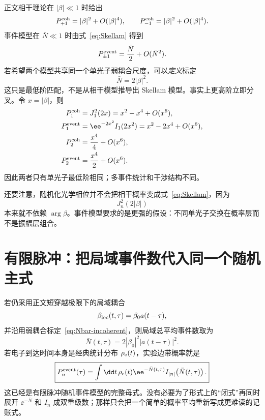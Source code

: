 正文相干理论在 \(|\beta|\ll1\) 时给出
\begin{equation}
P_{+1}^{\rm coh}=|\beta|^2+O(|\beta|^4),
\qquad
P_{-1}^{\rm coh}=|\beta|^2+O(|\beta|^4).
\end{equation}
事件模型在 \(\bar N\ll1\) 时由式~\eqref{eq:Skellam} 得到
\begin{equation}
P_{\pm1}^{\rm event}
=\frac{\bar N}{2}+O(\bar N^2).
\end{equation}
若希望两个模型共享同一个单光子弱耦合尺度，可以\emph{定义}标定
\begin{equation}
\boxed{\bar N=2|\beta|^2.}
\label{eq:Nbar-incoherent}
\end{equation}
这只是最低阶匹配，不是从相干模型推导出 Skellam 模型。事实上更高阶立即分叉。令 \(x=|\beta|\)，则
\begin{align}
P_1^{\rm coh}
&=J_1^2(2x)=x^2-x^4+O(x^6),\\
P_1^{\rm event}
&=\ee^{-2x^2}I_1(2x^2)=x^2-2x^4+O(x^6),\\
P_2^{\rm coh}
&=\frac{x^4}{4}+O(x^6),\\
P_2^{\rm event}
&=\frac{x^4}{2}+O(x^6).
\end{align}
因此两者只有单光子最低阶相同；多事件统计和干涉结构不同。

还要注意，随机化光学相位并不会把相干概率变成式~\eqref{eq:Skellam}，因为
\begin{equation}
J_n^2(2|\beta|)
\end{equation}
本来就不依赖 \(\arg\beta\)。事件模型要求的是更强的假设：不同单光子交换在概率层而不是振幅层组合。

\section{有限脉冲：把局域事件数代入同一个随机主式}

若仍采用正文短穿越极限下的局域耦合
\begin{equation}
\beta_{\rm loc}(t,\tau)=\beta_0a(t-\tau),
\end{equation}
并沿用弱耦合标定~\eqref{eq:Nbar-incoherent}，则局域总平均事件数取为
\begin{equation}
\boxed{
\bar N(t,\tau)
=2|\beta_0|^2|a(t-\tau)|^2.}
\label{eq:Nbar-local-event}
\end{equation}
若电子到达时间本身是经典统计分布 \(\rho_{\rm e}(t)\)，实验边带概率就是
\begin{equation}
\boxed{
P_n^{\rm event}(\tau)
=\int\dd t\,\rho_{\rm e}(t)
\ee^{-\bar N(t,\tau)}
I_{|n|}\!\left(\bar N(t,\tau)\right).}
\label{eq:event-pulse-average}
\end{equation}
这已经是有限脉冲随机事件模型的完整母式。没有必要为了形式上的“闭式”再同时展开 \(\ee^{-\bar N}\) 和 \(I_n\) 成双重级数；那样只会把一个简单的概率平均重新写成更难读的记账式。

